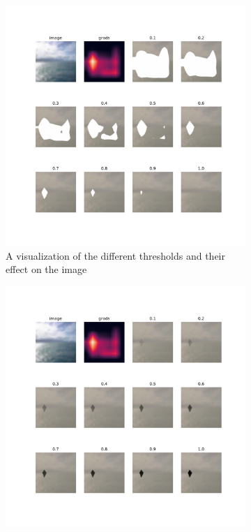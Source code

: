 \documentclass[a4paper,11pt,openright]{book}
\begin{document}
\begin{figure}[!htb]
    \begin{subfigure}[b]{0.5\textwidth}
        \includegraphics[width=\linewidth, right]{images/grad_threshold.pdf}
        \caption{A visualization of the different thresholds and their effect on the image}
        \label{fig:thresholds}
    \end{subfigure}
    \begin{subfigure}[b]{0.5\textwidth}
        \includegraphics[width=\linewidth, left]{images/multiply_threshold.pdf}

\end{subfigure}
\end{figure}
\end{document}
